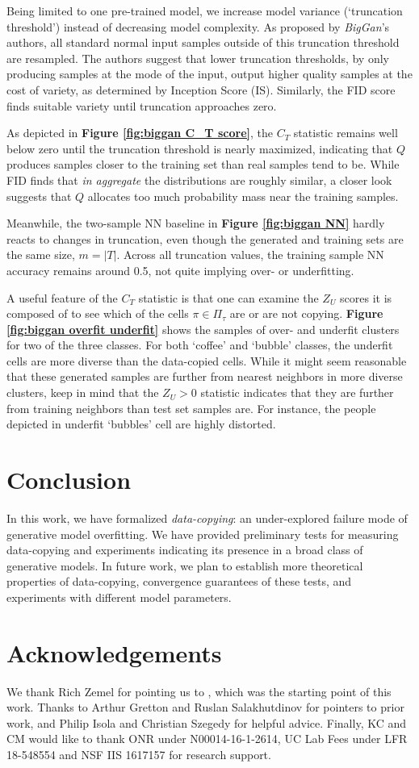 Being limited to one pre-trained model, we increase model variance (`truncation threshold') instead of decreasing model complexity. As proposed by \emph{BigGan}'s authors, all standard normal input samples outside of this truncation threshold are resampled. The authors suggest that lower truncation thresholds, by only producing samples at the mode of the input, output higher quality samples at the cost of variety, as determined by Inception Score (IS). Similarly, the FID score finds suitable variety until truncation approaches zero. 

As depicted in \textbf{ Figure \ref{fig:biggan C_T score}}, the $C_T$ statistic remains well below zero until the truncation threshold is nearly maximized, indicating that $Q$ produces samples closer to the training set than real samples tend to be. While FID finds that \emph{in aggregate} the distributions are roughly similar, a closer look suggests that $Q$ allocates too much probability mass near the training samples. 

Meanwhile, the two-sample NN baseline in \textbf{ Figure \ref{fig:biggan NN} } hardly reacts to changes in truncation, even though the generated and training sets are the same size, $m = |T|$. Across all truncation values, the training sample NN accuracy remains around 0.5, not quite implying over- or underfitting.  

A useful feature of the $C_T$ statistic is that one can examine the $Z_U$ scores it is composed of to see which of the cells $\pi \in \Pi_{\tau}$ are or are not copying. \textbf{ Figure \ref{fig:biggan overfit underfit} } shows the samples of over- and underfit clusters for two of the three classes. For both `coffee' and `bubble' classes, the underfit cells are more diverse than the data-copied cells. While it might seem reasonable that these generated samples are further from nearest neighbors in more diverse clusters, keep in mind that the $Z_U > 0$ statistic indicates that they are further from training neighbors than test set samples are. For instance, the people depicted in underfit `bubbles' cell are highly distorted.  

\section{Conclusion}
In this work, we have formalized \emph{data-copying}: an under-explored failure mode of generative model overfitting. We have provided preliminary tests for measuring data-copying and experiments indicating its presence in a broad class of generative models. In future work, we plan to establish more theoretical properties of data-copying, convergence guarantees of these tests, and experiments with different model parameters. 

\section{Acknowledgements}
We thank Rich Zemel for pointing us to \cite{Kilian}, which was the starting point of this work. Thanks to Arthur Gretton and Ruslan Salakhutdinov for pointers to prior work, and Philip Isola and Christian Szegedy for helpful advice. Finally, KC and CM would like to thank  ONR under N00014-16-1-2614,  UC Lab Fees under LFR 18-548554 and NSF IIS 1617157 for research support.